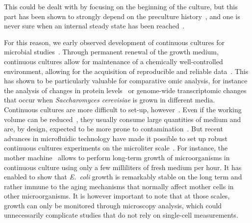 This could be dealt with by focusing on the beginning of the culture, but this part has been shown to strongly depend on the preculture history~\cite{ng_damage_1962,dufrenne_effect_1997,shaw_effect_1967}, and one is never sure when an internal steady state has been reached~\cite{myers_culture_1944}.

For this reason, we early observed development of continuous cultures for microbial studies~\cite{myers_culture_1944,novick_experiments_1950,herbert_continuous_1956}.
Through permanent renewal of the growth medium, continuous cultures allow for maintenance of a chemically well-controlled environment, allowing for the acquisition of reproducible and reliable data~\cite{borirak_molecular_2014,hoskisson_continuous_2005}.
This has shown to be particularly valuable for comparative omic analysis, for instance the analysis of changes in protein levels~\cite{kolkman_comparative_2005} or genome-wide transcriptomic changes~\cite{boer_genome-wide_2003} that occur when \textit{Saccharomyces cerevisiae} is grown in different media.
Continuous cultures are more difficult to set-up, however~\cite{novick_experiments_1950,borirak_molecular_2014}.
Even if the working volume can be reduced~\cite{betts_miniature_2006}, they usually consume large quantities of medium and are, by design, expected to be more prone to contamination~\cite{novick_experiments_1950}.
But recent advances in microfluidic technology have made it possible to set up robust continuous cultures experiments on the microliter scale~\cite{wang_robust_2010,balaban_bacterial_2004}.
For instance, the mother machine~\cite{wang_robust_2010} allows to perform long-term growth of microorganisms
in continuous culture using only a few milliliters of fresh medium per hour.
It has enabled to show that \textit{E.~coli} growth is remarkably stable on the long term and rather immune to the aging mechanisms that normally affect mother cells in other microorganisms.
It is however important to note that at those scales, growth can only be monitored through microscopy analysis, which could unnecessarily complicate studies that do not rely on single-cell measurements.

